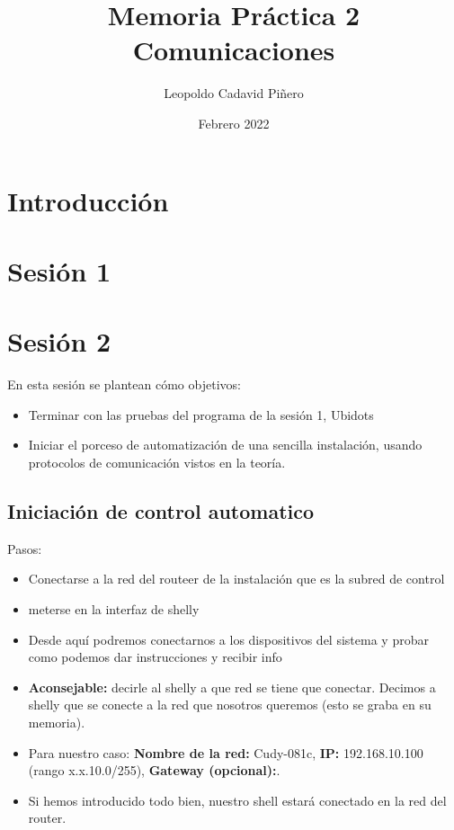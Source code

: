 \documentclass[12pt, a4paper]{article}
\title{Memoria Práctica 2 \\


\large Comunicaciones
}
\author{
Leopoldo Cadavid Piñero
}
\date{Febrero 2022}
\begin{document}
\maketitle
\newpage
\tableofcontents
\newpage
\section{Introducción}
      

\section{Sesión 1}

\section{Sesión 2}
 En esta sesión se plantean cómo objetivos:
 \begin{itemize}
     \item Terminar con las pruebas del programa de la sesión 1, Ubidots
     \item Iniciar el porceso de automatización de una sencilla instalación, usando protocolos de 
        comunicación vistos en la teoría.
    
    
    \end{itemize}

\subsection{Iniciación de control automatico}

Pasos:
\begin{itemize}
    \item Conectarse a la red del routeer de la instalación que es la subred de control
    \item meterse en la  interfaz de shelly
    \item Desde aquí podremos conectarnos a los dispositivos del sistema y probar como podemos dar instrucciones y recibir info
    \item \textbf{Aconsejable:} decirle al shelly a que red se tiene que conectar. Decimos a shelly que se conecte a la red que nosotros queremos
    (esto se graba en su memoria).
    \item Para nuestro caso: \textbf{Nombre de la red:} Cudy-081c, \textbf{IP:} 192.168.10.100 (rango x.x.10.0/255), 
    \textbf{Gateway (opcional):}. 
    \item Si hemos introducido todo bien, nuestro shell estará conectado en la red del router.

\end{itemize}
\end{document}
